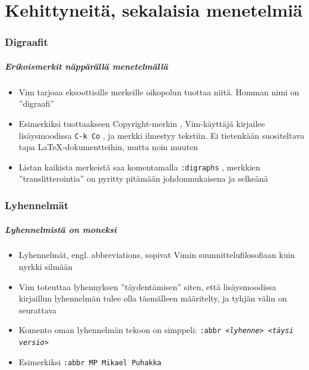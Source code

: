 \documentclass[]{beamer}
\newcommand{\Tohj}[1]{\texttt{#1}}
\newcommand{\com}[1]{{\color{blue!50!black}\Tohj{#1}} \!\!}
\begin{document}

\part{Kehittyneitä, sekalaisia menetelmiä}

\section{Digraafit}

\begin{frame}
    \frametitle{Erikoismerkit näppärällä menetelmällä}
    \begin{itemize}
        \item Vim tarjoaa eksoottisille merkeille oikopolun tuottaa niitä. Homman nimi on ''digraafi''
        \item Esimerkiksi tuottaakseen Copyright-merkin \textcopyright, Vim-käyttäjä kirjailee lisäysmoodissa \com{C-k Co}, ja merkki ilmestyy tekstiin. Ei tietenkään suositeltava tapa \LaTeX -dokumentteihin, mutta noin muuten
        \item Listan kaikista merkeistä saa komentamalla \com{:digraphs}, merkkien ''translitterointia'' on pyritty pitämään johdonmukaisena ja selkeänä
    \end{itemize}
\end{frame}

\section{Lyhennelmät}

\begin{frame}
    \frametitle{Lyhennelmistä on moneksi}
    \begin{itemize}
        \item Lyhennelmät, engl. abbreviations, sopivat Vimin suunnittelufilosofiaan kuin nyrkki silmään
        \item Vim toteuttaa lyhennyksen ''täydentämisen'' siten, että lisäysmoodissa kirjaillun lyhennelmän tulee olla täsmälleen määritelty, ja tyhjän välin on seurattava
        \pause
        \item Komento oman lyhennelmän tekoon on simppeli: \com{:abbr <\emph{lyhenne}> <\emph{täysi versio}>}
        \item Esimerkiksi \com{:abbr MP Mikael Puhakka}
    \end{itemize}
\end{frame}
\end{document}
